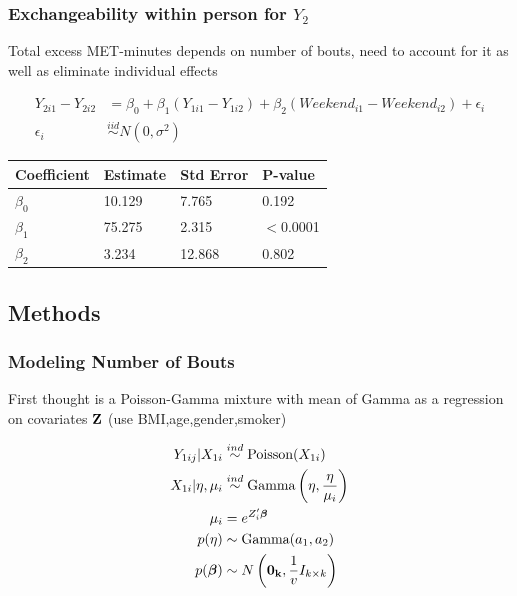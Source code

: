 \documentclass[handout]{beamer}\usepackage[]{graphicx}\usepackage[]{color}
\begin{document}
\begin{frame}
\frametitle{Exchangeability within person for $Y_2$}
Total excess MET-minutes depends on number of bouts, need to account for it as well as eliminate individual effects

\begin{align*}
Y_{2i1}-Y_{2i2} &= \beta_0 + \beta_1(Y_{1i1}-Y_{1i2}) + \beta_2(Weekend_{i1}-Weekend_{i2}) + \epsilon_i \\
\epsilon_i &\overset{iid}{\sim} N(0,\sigma^2)
\end{align*}

\begin{table}[!htbp] \centering 
\begin{tabular}{l|lll}
\hline
Coefficient & Estimate & Std Error & P-value \\
\hline
$\beta_0$ & 10.129 & 7.765 & 0.192 \\
$\beta_1$ & 75.275 & 2.315 & $<$0.0001 \\
$\beta_2$ & 3.234 & 12.868 & 0.802 \\
\hline
\end{tabular} 
\end{table} 



\end{frame}

\subsection{Methods}

\begin{frame}
\frametitle{Modeling Number of Bouts}
First thought is a Poisson-Gamma mixture with mean of Gamma as a regression on covariates ${\bf Z}$ (use BMI,age,gender,smoker)

\begin{align*}
	Y_{1ij} | X_{1i} &\overset{ind}{\sim} \text{Poisson}(X_{1i}) \\
	X_{1i} | \eta,\mu_i &\overset{ind}{\sim} \text{Gamma} \left( \eta,\frac{\eta}{\mu_i} \right) \\
	\mu_i &= e^{Z_i' \boldsymbol{\beta}} \\
	p(\eta) &\sim \text{Gamma}(a_1,a_2) \\
	p(\boldsymbol{\beta}) &\sim N \left( {\bf 0_k}, \frac{1}{v} I_{k \times k} \right)
\end{align*}

\end{frame}
\end{document}
